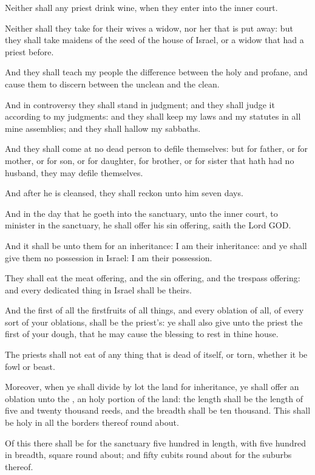\Verse Neither shall any priest drink wine, when they enter into the inner court.

\Verse Neither shall they take for their wives a widow, nor her that is put away: but they shall take maidens of the seed of the house of Israel, or a widow that had a priest before.

\Verse And they shall teach my people the difference between the holy and profane, and cause them to discern between the unclean and the clean.

\Verse And in controversy they shall stand in judgment; and they shall judge it according to my judgments: and they shall keep my laws and my statutes in all mine assemblies; and they shall hallow my sabbaths.

\Verse And they shall come at no dead person to defile themselves: but for father, or for mother, or for son, or for daughter, for brother, or for sister that hath had no husband, they may defile themselves.

\Verse And after he is cleansed, they shall reckon unto him seven days.

\Verse And in the day that he goeth into the sanctuary, unto the inner court, to minister in the sanctuary, he shall offer his sin offering, saith the Lord GOD.

\Verse And it shall be unto them for an inheritance: I am their inheritance: and ye shall give them no possession in Israel: I am their possession.

\Verse They shall eat the meat offering, and the sin offering, and the trespass offering: and every dedicated thing in Israel shall be theirs.

\Verse And the first of all the firstfruits of all things, and every oblation of all, of every sort of your oblations, shall be the priest's: ye shall also give unto the priest the first of your dough, that he may cause the blessing to rest in thine house.

\Verse The priests shall not eat of any thing that is dead of itself, or torn, whether it be fowl or beast.


\Chapter
\Verse Moreover, when ye shall divide by lot the land for inheritance, ye shall offer an oblation unto the \LORD, an holy portion of the land: the length shall be the length of five and twenty thousand reeds, and the breadth shall be ten thousand. This shall be holy in all the borders thereof round about.

\Verse Of this there shall be for the sanctuary five hundred in length, with five hundred in breadth, square round about; and fifty cubits round about for the suburbs thereof.

